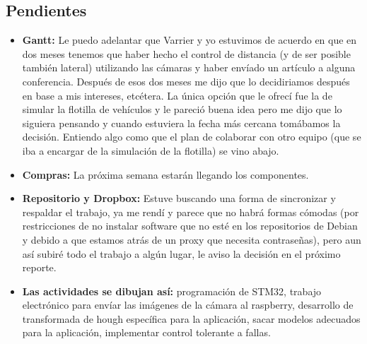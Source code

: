 \subsection{Pendientes}

\begin{itemize}
\item \textbf{Gantt:} Le puedo adelantar que Varrier y yo estuvimos de acuerdo en que en dos meses tenemos que haber hecho el control de distancia (y de ser posible también lateral) utilizando las cámaras y haber envíado un artículo a alguna conferencia. Después de esos dos meses me dijo que lo decidiriamos después en base a mis intereses, etcétera. La única opción que le ofrecí fue la de simular la flotilla de vehículos y le pareció buena idea pero me dijo que lo siguiera pensando y cuando estuviera la fecha más cercana tomábamos la decisión. Entiendo algo como que el plan de colaborar con otro equipo (que se iba a encargar de la simulación de la flotilla) se vino abajo.
\item \textbf{Compras:} La próxima semana estarán llegando los componentes.
\item \textbf{Repositorio y Dropbox:} Estuve buscando una forma de sincronizar y respaldar el trabajo, ya me rendí y parece que no habrá formas cómodas (por restricciones de no instalar software que no esté en los repositorios de Debian y debido a que estamos atrás de un proxy que necesita contraseñas), pero aun así subiré todo el trabajo a algún lugar, le aviso la decisión en el próximo reporte.
\item \textbf{Las actividades se dibujan así:} programación de STM32, trabajo electrónico para envíar las imágenes de la cámara al raspberry, desarrollo de transformada de hough específica para la aplicación, sacar modelos adecuados para la aplicación, implementar control tolerante a fallas.
\end{itemize}
